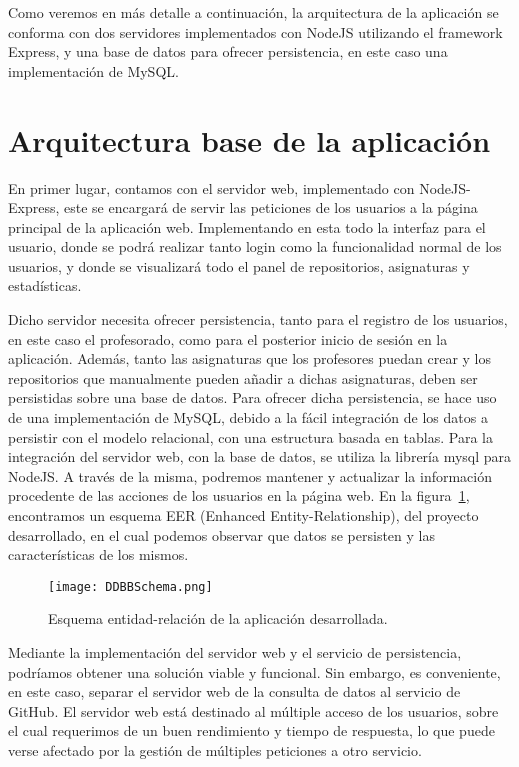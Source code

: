 Como veremos en más detalle a continuación, la arquitectura de la
aplicación se conforma con dos servidores implementados con NodeJS
utilizando el framework Express, y una base de datos para ofrecer
persistencia, en este caso una implementación de MySQL.


\section{Arquitectura base de la aplicación}

En primer lugar, contamos con el servidor web, implementado con
NodeJS-Express, este se encargará de servir las peticiones de los usuarios
a la página principal de la aplicación web. Implementando en esta todo la
interfaz para el usuario, donde se podrá realizar tanto login como la
funcionalidad normal de los usuarios, y donde se visualizará todo el panel
de repositorios, asignaturas y estadísticas.

Dicho servidor necesita ofrecer persistencia, tanto para el registro de los
usuarios, en este caso el profesorado, como para el posterior inicio de
sesión en la aplicación. Además, tanto las asignaturas que los profesores
puedan crear y los repositorios que manualmente pueden añadir a dichas
asignaturas, deben ser persistidas sobre una base de datos. Para ofrecer
dicha persistencia, se hace uso de una implementación de MySQL, debido a la
fácil integración de los datos a persistir con el modelo relacional, con
una estructura basada en tablas. Para la integración del servidor web, con
la base de datos, se utiliza la librería mysql para NodeJS. A través de la
misma, podremos mantener y actualizar la información procedente de las
acciones de los usuarios en la página web. En la
figura~\ref{figure:MySQLDraw}, encontramos un esquema EER (Enhanced
Entity-Relationship), del proyecto desarrollado, en el cual podemos
observar que datos se persisten y las características de los mismos.

\begin{figure}[h!]
  \texttt{[image: DDBBSchema.png]}
  \caption{Esquema entidad-relación de la aplicación desarrollada.}
  \label{figure:MySQLDraw}
\end{figure}

Mediante la implementación del servidor web y el servicio de persistencia,
podríamos obtener una solución viable y funcional. Sin embargo, es
conveniente, en este caso, separar el servidor web de la consulta de datos
al servicio de GitHub. El servidor web está destinado al múltiple acceso de
los usuarios, sobre el cual requerimos de un buen rendimiento y tiempo de
respuesta, lo que puede verse afectado por la gestión de múltiples
peticiones a otro servicio.

